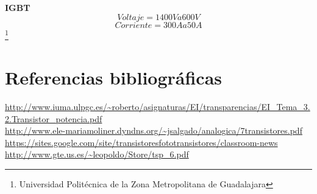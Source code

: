 \documentclass[10pt,a4paper]{article}
\begin{document}
\textbf{IGBT}
\begin{equation}
Voltaje = 1400V a 600V
\end{equation}
\begin{equation}
Corriente = 300A a 50A
\end{equation}
\footnote{Universidad Politécnica de la Zona Metropolitana de Guadalajara}

\newpage
\section{Referencias bibliográficas}

\url{http://www.iuma.ulpgc.es/~roberto/asignaturas/EI/transparencias/EI_Tema_3.2.Transistor_potencia.pdf}\\

\url{http://www.ele-mariamoliner.dyndns.org/~jsalgado/analogica/7transistores.pdf}\\

\url{https://sites.google.com/site/transistoresfototransistores/classroom-news}\\

\url{http://www.gte.us.es/~leopoldo/Store/tsp_6.pdf}\\
\end{document}
